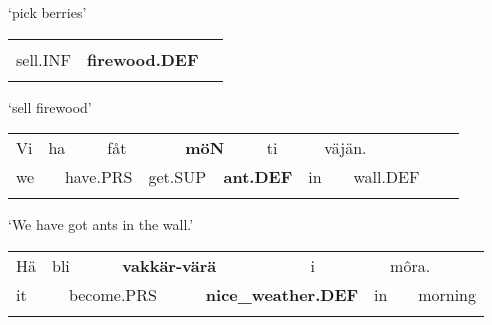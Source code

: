 \begin{styleTranslation}
‘pick berries’

\end{styleTranslation}

\begin{tabular}{lll}
\lsptoprule
\multicolumn{3}{l}{sälä

}\\
sell.INF & {\bfseries firewood.DEF} & \\
\lspbottomrule
\end{tabular}

\begin{styleTranslation}
‘sell firewood’

\end{styleTranslation}

\begin{tabular}{llllllllllllll}
\lsptoprule
Vi & \multicolumn{2}{l}{ha

} & \multicolumn{2}{l}{fåt

} & \multicolumn{2}{l}{{\bfseries möN}

} & \multicolumn{2}{l}{ti

} & \multicolumn{2}{l}{väjän.

} & \multicolumn{2}{l}{} & \\
\multicolumn{2}{l}{we

} & \multicolumn{2}{l}{have.PRS

} & \multicolumn{2}{l}{get.SUP

} & \multicolumn{2}{l}{{\bfseries ant.DEF}

} & \multicolumn{2}{l}{in

} & \multicolumn{2}{l}{wall.DEF

} & \multicolumn{2}{l}{}\\
\lspbottomrule
\end{tabular}

\begin{styleTranslation}
‘We have got ants in the wall.’

\end{styleTranslation}

\begin{tabular}{llllllllll}
\lsptoprule
Hä & \multicolumn{2}{l}{bli

} & \multicolumn{2}{l}{{\bfseries vakkär-värä}

} & \multicolumn{2}{l}{i

} & \multicolumn{2}{l}{môra.

} & \\
\multicolumn{2}{l}{it

} & \multicolumn{2}{l}{become.PRS

} & \multicolumn{2}{l}{{\bfseries nice\_weather.DEF}

} & \multicolumn{2}{l}{in

} & \multicolumn{2}{l}{morning

}\\
\lspbottomrule
\end{tabular}

